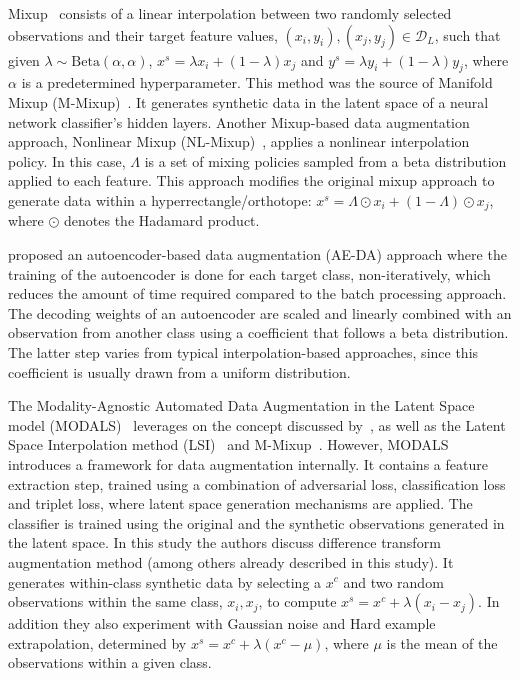 Mixup~\cite{zhang2018mixup} consists of a linear interpolation between two
randomly selected observations and their target feature values, $(x_i, y_i),
(x_j, y_j) \in \mathcal{D}_L$, such that given $\lambda \sim
\text{Beta}(\alpha,\alpha)$, $x^s = \lambda x_i + (1-\lambda) x_j$ and $y^s =
\lambda y_i + (1-\lambda) y_j$, where $\alpha$ is a predetermined
hyperparameter. This method was the source of Manifold Mixup
(M-Mixup)~\cite{verma2019manifold}. It generates synthetic data in the latent
space of a neural network classifier's hidden layers. Another Mixup-based
data augmentation approach, Nonlinear Mixup
(NL-Mixup)~\cite{guo2020nonlinear}, applies a nonlinear interpolation policy.
In this case, $\Lambda$ is a set of mixing policies sampled from a beta
distribution applied to each feature. This approach modifies the original
mixup approach to generate data within a hyperrectangle/orthotope: $x^s =
\Lambda \odot x_i + (1-\Lambda) \odot x_j$, where $\odot$ denotes the Hadamard
product.

\citet{feng2020autuencoder} proposed an autoencoder-based data augmentation
(AE-DA) approach where the training of the autoencoder is done for each target
class, non-iteratively, which reduces the amount of time required compared to
the batch processing approach. The decoding weights of an autoencoder are
scaled and linearly combined with an observation from another class using a
coefficient that follows a beta distribution. The latter step varies from
typical interpolation-based approaches, since this coefficient is usually
drawn from a uniform distribution.

The Modality-Agnostic Automated Data Augmentation in the Latent Space model
(MODALS)~\cite{cheung2020modals} leverages on the concept discussed
by~\citet{DeVries2017}, as well as the Latent Space Interpolation
method (LSI)~\cite{liu2018data} and M-Mixup~\cite{verma2019manifold}.
However, MODALS introduces a framework for data augmentation internally. It
contains a feature extraction step, trained using a combination of adversarial
loss, classification loss and triplet loss, where latent space generation
mechanisms are applied. The classifier is trained using the original and the
synthetic observations generated in the latent space. In this study the
authors discuss difference transform augmentation method (among others already
described in this study). It generates within-class synthetic data by
selecting a $x^c$ and two random observations within the same class, $x_i,
x_j$, to compute $x^s = x^c + \lambda (x_i-x_j)$. In addition they also
experiment with Gaussian noise and Hard example extrapolation, determined by
$x^s = x^c + \lambda (x^c-\mu)$, where $\mu$ is the mean of the observations
within a given class.

